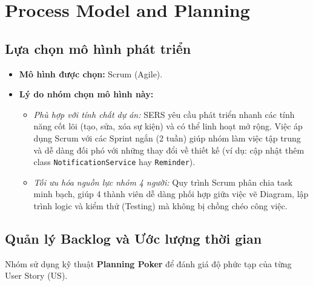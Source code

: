 \section{Process Model and Planning}
\subsection{Lựa chọn mô hình phát triển}
\begin{itemize}[leftmargin=*]
    \item \textbf{Mô hình được chọn:} Scrum (Agile).
    \item \textbf{Lý do nhóm chọn mô hình này:} 
    \begin{itemize}
        \item \textit{Phù hợp với tính chất dự án:} SERS yêu cầu phát triển nhanh các tính năng cốt lõi (tạo, sửa, xóa sự kiện) và có thể linh hoạt mở rộng. Việc áp dụng Scrum với các Sprint ngắn (2 tuần) giúp nhóm làm việc tập trung và dễ dàng đối phó với những thay đổi về thiết kế (ví dụ: cập nhật thêm class \texttt{NotificationService} hay \texttt{Reminder}).
        \item \textit{Tối ưu hóa nguồn lực nhóm 4 người:} Quy trình Scrum phân chia task minh bạch, giúp 4 thành viên dễ dàng phối hợp giữa việc vẽ Diagram, lập trình logic và kiểm thử (Testing) mà không bị chồng chéo công việc.
    \end{itemize}
\end{itemize}

\subsection{Quản lý Backlog và Ước lượng thời gian}
Nhóm sử dụng kỹ thuật \textbf{Planning Poker} để đánh giá độ phức tạp của từng User Story (US).

